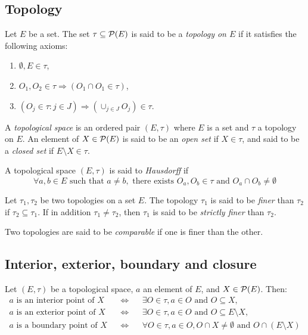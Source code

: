 \subsection{Topology}

\begin{definition}
    Let $E$ be a set. The set $\tau \subseteq \mathcal{P}(E)$ is said to be a \emph{topology on $E$} if it satisfies the following axioms:
    \begin{enumerate}
        \item $\emptyset, E \in \tau$,
        \item $O_1, O_2 \in \tau \Rightarrow (O_1 \cap O_1 \in \tau)$,
        \item $(O_j \in \tau : j \in J) \Rightarrow (\cup_{j \in J} O_j) \in \tau$.
    \end{enumerate} 
    A \emph{topological space} is an ordered pair $(E, \tau)$ where $E$ is a set and $\tau$ a topology on $E$.
    An element of $X \in \mathcal{P}(E)$ is said to be an \emph{open set} if $X \in \tau$, and said to be a \emph{closed set} if $E \setminus X \in \tau$.
\end{definition}

\begin{definition}
    A topological space $(E, \tau)$ is said to \emph{Hausdorff} if
    \begin{equation*}
        \forall a,b \in E \text{ such that } a \neq b, \text{ there exists } O_a, O_b \in \tau \text{ and } O_a \cap O_b \neq \emptyset
    \end{equation*}
\end{definition}

\begin{definition}
    Let $\tau_1, \tau_2$ be two topologies on a set $E$. The topology $\tau_1$ is said to be \emph{finer} than $\tau_2$ if $\tau_2 \subseteq \tau_1$.
    If in addition $\tau_1 \neq \tau_2$, then $\tau_1$ is said to be \emph{strictly finer} than $\tau_2$. 
\end{definition}

Two topologies are said to be \emph{comparable} if one is finer than the other.

\subsection{Interior, exterior, boundary and closure}

\begin{definition}
    Let $(E, \tau)$ be a topological space, $a$ an element of $E$, and $X \in \mathcal{P}(E)$. Then:
    \begin{align*}
        a \text{ is an interior point of } X && \Leftrightarrow && \exists O \in \tau, a \in O \text{ and } O \subseteq X, \\
        a \text{ is an exterior point of } X && \Leftrightarrow && \exists O \in \tau, a \in O \text{ and } O \subseteq E \setminus X, \\
        a \text{ is a boundary point of } X && \Leftrightarrow && \forall O \in \tau, a \in O , O \cap X \neq \emptyset \text{ and } O \cap (E \setminus X) \\
    \end{align*}
\end{definition}


